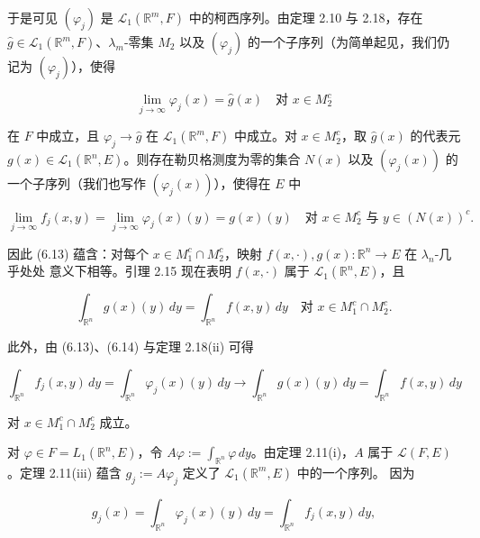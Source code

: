 \begin{theorem}
\begin{items}
于是可见 $ (\varphi_j) $ 是 $ \mathcal{L}_1(\mathbb{R}^m,F) $ 中的柯西序列。由定理 2.10 与 2.18，存在 $ \widehat{g} \in \mathcal{L}_1(\mathbb{R}^m,F) $、$ \lambda_m $-零集 $ M_2 $ 以及 $ (\varphi_j) $ 的一个子序列（为简单起见，我们仍记为 $ (\varphi_j) $），使得

\begin{equation}
\lim_{j\to\infty}\varphi_j(x) = \widehat{g}(x) \quad \text{对 } x \in M_2^c\tag{6.14}
\end{equation}

在 $ F $ 中成立，且 $ \varphi_j \to \widehat{g} $ 在 $ \mathcal{L}_1(\mathbb{R}^m,F) $ 中成立。对 $ x \in M_2^c $，取 $ \widehat{g}(x) $ 的代表元 $ g(x) \in \mathcal{L}_1(\mathbb{R}^n,E) $。则存在勒贝格测度为零的集合 $ N(x) $ 以及 $ (\varphi_j(x)) $ 的一个子序列（我们也写作 $ (\varphi_j(x)) $），使得在 $ E $ 中

\[
\lim_{j\to\infty} f_j(x,y) = \lim_{j\to\infty}\varphi_j(x)(y) = g(x)(y) \quad \text{对 } x \in M_2^c \text{ 与 } y \in (N(x))^c .
\]

因此 (6.13) 蕴含：对每个 $ x \in M_1^c \cap M_2^c $，映射 $ f(x,\cdot), g(x) : \mathbb{R}^n \to E $ 在 $ \lambda_n $-几乎处处 意义下相等。引理 2.15 现在表明 $ f(x,\cdot) $ 属于 $ \mathcal{L}_1(\mathbb{R}^n,E) $，且

\begin{equation}
\int_{\mathbb{R}^n} g(x)(y)\,dy = \int_{\mathbb{R}^n} f(x,y)\,dy \quad \text{对 } x \in M_1^c \cap M_2^c .\tag{6.15}
\end{equation}

此外，由 (6.13)、(6.14) 与定理 2.18(ii) 可得

\begin{equation}
\int_{\mathbb{R}^n} f_j(x,y)\,dy = \int_{\mathbb{R}^n}\varphi_j(x)(y)\,dy \to \int_{\mathbb{R}^n} g(x)(y)\,dy = \int_{\mathbb{R}^n} f(x,y)\,dy\tag{6.16}
\end{equation}

对 $ x \in M_1^c \cap M_2^c $ 成立。

\item

对 $ \varphi \in F = L_1(\mathbb{R}^n,E) $，令 $ A\varphi := \int_{\mathbb{R}^n}\varphi\,dy $。由定理 2.11(i)，$ A $ 属于 $ \mathcal{L}(F,E) $。定理 2.11(iii) 蕴含 $ g_j := A\varphi_j $ 定义了 $ \mathcal{L}_1(\mathbb{R}^m,E) $ 中的一个序列。
因为

\begin{equation}
g_j(x) = \int_{\mathbb{R}^n}\varphi_j(x)(y)\,dy = \int_{\mathbb{R}^n} f_j(x,y)\,dy ,\tag{6.17}
\end{equation}


\end{items}
\end{theorem}
